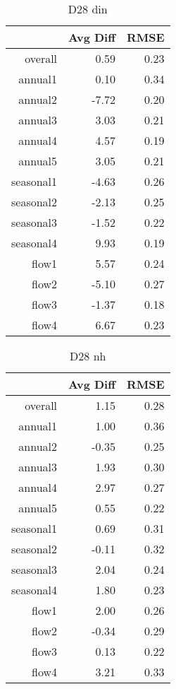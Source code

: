 \begin{table}[H]
\centering
\begin{tabular}{rrr}
  \hline
 & Avg Diff & RMSE \\ 
  \hline
overall & 0.59 & 0.23 \\ 
  annual1 & 0.10 & 0.34 \\ 
  annual2 & -7.72 & 0.20 \\ 
  annual3 & 3.03 & 0.21 \\ 
  annual4 & 4.57 & 0.19 \\ 
  annual5 & 3.05 & 0.21 \\ 
  seasonal1 & -4.63 & 0.26 \\ 
  seasonal2 & -2.13 & 0.25 \\ 
  seasonal3 & -1.52 & 0.22 \\ 
  seasonal4 & 9.93 & 0.19 \\ 
  flow1 & 5.57 & 0.24 \\ 
  flow2 & -5.10 & 0.27 \\ 
  flow3 & -1.37 & 0.18 \\ 
  flow4 & 6.67 & 0.23 \\ 
   \hline
\end{tabular}
\caption{D28 din} 
\end{table}
\begin{table}[H]
\centering
\begin{tabular}{rrr}
  \hline
 & Avg Diff & RMSE \\ 
  \hline
overall & 1.15 & 0.28 \\ 
  annual1 & 1.00 & 0.36 \\ 
  annual2 & -0.35 & 0.25 \\ 
  annual3 & 1.93 & 0.30 \\ 
  annual4 & 2.97 & 0.27 \\ 
  annual5 & 0.55 & 0.22 \\ 
  seasonal1 & 0.69 & 0.31 \\ 
  seasonal2 & -0.11 & 0.32 \\ 
  seasonal3 & 2.04 & 0.24 \\ 
  seasonal4 & 1.80 & 0.23 \\ 
  flow1 & 2.00 & 0.26 \\ 
  flow2 & -0.34 & 0.29 \\ 
  flow3 & 0.13 & 0.22 \\ 
  flow4 & 3.21 & 0.33 \\ 
   \hline
\end{tabular}
\caption{D28 nh} 
\end{table}

